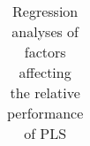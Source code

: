 \documentclass[10pt]{a0poster}
\begin{document}


\begin{table}[ht]
\begin{center}
\caption{Regression analyses of factors affecting the relative performance of PLS}
\begin{tabular}{lrrrrrrrrrrrr}
 \toprule
\midrule
%
\bottomrule
\end{tabular}
\end{center}
\end{table}
\end{document}

